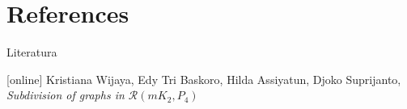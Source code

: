 \documentclass{beamer}
\theoremstyle{definition}
\begin{document}
\section{References}
\begin{frame}[allowframebreaks]{Literatura}
\begin{thebibliography}{}
	[online]
	Kristiana Wijaya, Edy Tri Baskoro, Hilda Assiyatun, Djoko Suprijanto, \textit{Subdivision of graphs in $\mathcal{R}(mK_2,P_4)$}
\end{thebibliography}
\end{frame}
\end{document}
